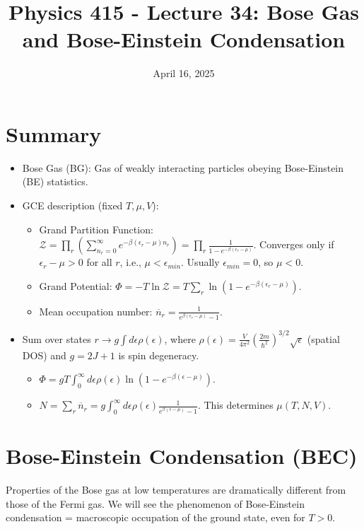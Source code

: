 \documentclass[11pt]{article}
\title{Physics 415 - Lecture 34: Bose Gas and Bose-Einstein Condensation}
\date{April 16, 2025}
\author{} %
\newcommand{\grandpartfn}{\mathcal{Z}} %
\newcommand{\eps}{\epsilon}
\newcommand{\nbar}{\overline{n}} %
\begin{document}
\maketitle
\thispagestyle{empty}

\section*{Summary}

\begin{itemize}
    \item Bose Gas (BG): Gas of weakly interacting particles obeying Bose-Einstein (BE) statistics.
    \item GCE description (fixed $T, \mu, V$):
        \begin{itemize}
            \item Grand Partition Function: $\grandpartfn = \prod_r \left( \sum_{n_r=0}^{\infty} e^{-\beta(\eps_r-\mu)n_r} \right) = \prod_r \frac{1}{1 - e^{-\beta(\eps_r-\mu)}}$. Converges only if $\eps_r - \mu > 0$ for all $r$, i.e., $\mu < \eps_{min}$. Usually $\eps_{min}=0$, so $\mu < 0$.
            \item Grand Potential: $\Phi = -T \ln \grandpartfn = T \sum_r \ln(1 - e^{-\beta(\eps_r-\mu)})$.
            \item Mean occupation number: $\nbar_r = \frac{1}{e^{\beta(\eps_r-\mu)} - 1}$.
        \end{itemize}
    \item Sum over states $r \to g \int d\eps \rho(\eps)$, where $\rho(\eps) = \frac{V}{4\pi^2}(\frac{2m}{\hbar^2})^{3/2} \sqrt{\eps}$ (spatial DOS) and $g=2J+1$ is spin degeneracy.
        \begin{itemize}
            \item $\Phi = g T \int_0^\infty d\eps \rho(\eps) \ln(1 - e^{-\beta(\eps-\mu)})$.
            \item $N = \sum_r \nbar_r = g \int_0^\infty d\eps \rho(\eps) \frac{1}{e^{\beta(\eps-\mu)} - 1}$. This determines $\mu(T, N, V)$.
        \end{itemize}
\end{itemize}

\section*{Bose-Einstein Condensation (BEC)}

Properties of the Bose gas at low temperatures are dramatically different from those of the Fermi gas. We will see the phenomenon of Bose-Einstein condensation = macroscopic occupation of the ground state, even for $T>0$.
\end{document}

